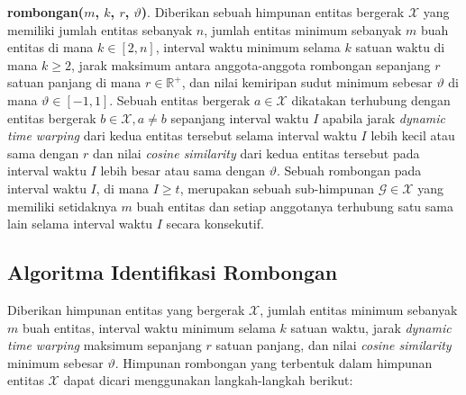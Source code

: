 \documentclass[a4paper,twoside]{article}
\begin{document}
\noindent \textbf{rombongan($m$, $k$, $r$, $\vartheta$)}. Diberikan sebuah himpunan entitas bergerak $\mathcal{X}$ yang memiliki jumlah entitas sebanyak $n$, jumlah entitas minimum sebanyak $m$ buah entitas di mana $k \in [2, n]$, interval waktu minimum selama $k$ satuan waktu di mana $k \geq 2$, jarak maksimum antara anggota-anggota rombongan sepanjang $r$ satuan panjang di mana $r \in \mathbb{R}^+$, dan nilai kemiripan sudut minimum sebesar $\vartheta$ di mana $\vartheta \in [-1, 1]$. Sebuah entitas bergerak $a \in \mathcal{X}$ dikatakan terhubung dengan entitas bergerak $b \in \mathcal{X}, a \neq b$ sepanjang interval waktu $I$ apabila jarak \textit{dynamic time warping} dari kedua entitas tersebut selama interval waktu $I$ lebih kecil atau sama dengan $r$ dan nilai \textit{cosine similarity} dari kedua entitas tersebut pada interval waktu $I$ lebih besar atau sama dengan $\vartheta$. Sebuah rombongan pada interval waktu $I$, di mana $I \geq t$, merupakan sebuah sub-himpunan $\mathcal{G} \in \mathcal{X}$ yang memiliki setidaknya $m$ buah entitas dan setiap anggotanya terhubung satu sama lain selama interval waktu $I$ secara konsekutif. 

\subsection{Algoritma Identifikasi Rombongan}

Diberikan himpunan entitas yang bergerak $\mathcal{X}$, jumlah entitas minimum sebanyak $m$ buah entitas, interval waktu minimum selama $k$ satuan waktu, jarak \textit{dynamic time warping} maksimum sepanjang $r$ satuan panjang, dan nilai \textit{cosine similarity} minimum sebesar $\vartheta$. Himpunan rombongan yang terbentuk dalam himpunan entitas $\mathcal{X}$ dapat dicari menggunakan langkah-langkah berikut:
\end{document}
